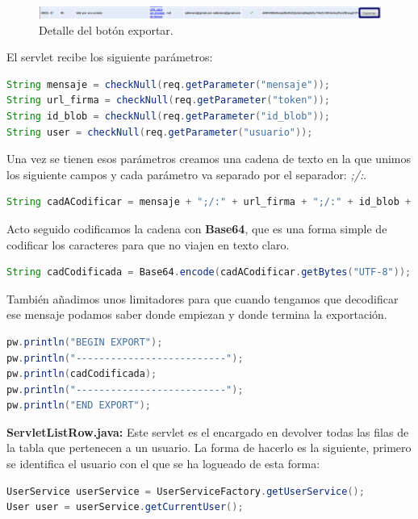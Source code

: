 \begin{description}
\begin{figure}
  \centering
    \includegraphics[scale=0.5]{./GoogleAppEngine/imagenes/botonExportar.png}
  \caption{Detalle del botón exportar.}
  \label{fig:botonExportar}
\end{figure}

El servlet recibe los siguiente parámetros:

\begin{lstlisting}[language=Java]
String mensaje = checkNull(req.getParameter("mensaje"));
String url_firma = checkNull(req.getParameter("token"));
String id_blob = checkNull(req.getParameter("id_blob"));
String user = checkNull(req.getParameter("usuario"));
\end{lstlisting}

Una vez se tienen esos parámetros creamos una cadena de texto en la que unimos los siguiente campos y cada parámetro va separado por el separador: \textit{;/:}.
\begin{lstlisting}[language=Java]
String cadACodificar = mensaje + ";/:" + url_firma + ";/:" + id_blob + ";/:" + user;
\end{lstlisting}

Acto seguido codificamos la cadena con \textbf{Base64}, que es una forma simple de codificar los caracteres para que no viajen en texto claro.
\begin{lstlisting}[language=Java]
String cadCodificada = Base64.encode(cadACodificar.getBytes("UTF-8"));
\end{lstlisting}

También añadimos unos limitadores para que cuando tengamos que decodificar ese mensaje podamos saber donde empiezan y donde termina la exportación.
\begin{lstlisting}[language=Java]
pw.println("BEGIN EXPORT");
pw.println("--------------------------");
pw.println(cadCodificada);
pw.println("--------------------------");
pw.println("END EXPORT");
\end{lstlisting}

\item \textbf{ServletListRow.java:} Este servlet es el encargado en devolver todas las filas de la tabla que pertenecen a un usuario. La forma de hacerlo es la siguiente, primero se identifica el usuario con el que se ha logueado de esta forma:

\begin{lstlisting}[language=Java]
UserService userService = UserServiceFactory.getUserService();
User user = userService.getCurrentUser();
\end{lstlisting}


\end{description}
